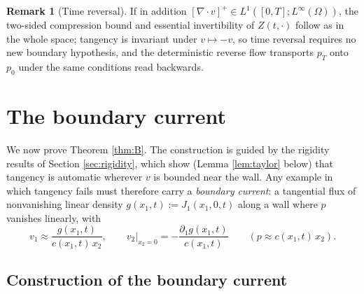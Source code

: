 \documentclass[11pt]{amsart}
\theoremstyle{definition}
\newtheorem{remark}[theorem]{Remark}
\newcommand{\dive}{\nabla\!\cdot}
\begin{document}
\begin{remark}[Time reversal]\label{rem:timerev}
If in addition $[\dive v]^+\in L^1([0,T];L^\infty(\Omega))$, the
two-sided compression bound and essential invertibility of
$Z(t,\cdot)$ follow as in the whole space; tangency is invariant
under $v\mapsto-v$, so time reversal requires no new boundary
hypothesis, and the deterministic reverse flow transports $p_T$ onto
$p_0$ under the same conditions read backwards.
\end{remark}

\section{The boundary current}\label{sec:mainB}

We now prove Theorem \ref{thm:B}. The construction is guided by the
rigidity results of Section \ref{sec:rigidity}, which show (Lemma
\ref{lem:taylor} below) that tangency is automatic wherever $v$ is
bounded near the wall. Any example in which tangency fails must
therefore carry a \emph{boundary current}: a tangential flux of
nonvanishing linear density
$g(x_1,t):=J_1(x_1,0,t)$ along a wall where $p$ vanishes linearly,
with
\begin{equation}\label{eq:bcstructure}
v_1\approx\frac{g(x_1,t)}{c(x_1,t)\,x_2},\qquad
v_2\big|_{x_2=0}=-\frac{\partial_1g(x_1,t)}{c(x_1,t)}
\qquad (p\approx c(x_1,t)\,x_2) .
\end{equation}

\subsection{Construction of the boundary current}
\end{document}
